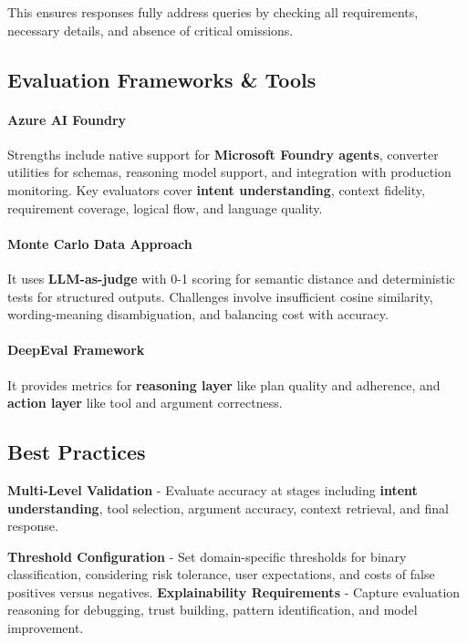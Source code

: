 \begin{TNtwocol}
This ensures responses fully address queries by checking all requirements, necessary details, and absence of critical omissions.

\subsection*{Evaluation Frameworks \& Tools}

\paragraph{\textbf{Azure AI Foundry}}

Strengths include native support for \textbf{Microsoft Foundry agents}, converter utilities for schemas, reasoning model support, and integration with production monitoring. Key evaluators cover \textbf{intent understanding}, context fidelity, requirement coverage, logical flow, and language quality.

\paragraph{\textbf{Monte Carlo Data Approach}}

It uses \textbf{LLM-as-judge} with 0-1 scoring for semantic distance and deterministic tests for structured outputs. Challenges involve insufficient cosine similarity, wording-meaning disambiguation, and balancing cost with accuracy.

\paragraph{\textbf{DeepEval Framework}}

It provides metrics for \textbf{reasoning layer} like plan quality and adherence, and \textbf{action layer} like tool and argument correctness.

\subsection*{Best Practices}

 {\textbf{Multi-Level Validation}} - Evaluate accuracy at stages including \textbf{intent understanding}, tool selection, argument accuracy, context retrieval, and final response.

{\textbf{Threshold Configuration}} - Set domain-specific thresholds for binary classification, considering risk tolerance, user expectations, and costs of false positives versus negatives.
{\textbf{Explainability Requirements}} - Capture evaluation reasoning for debugging, trust building, pattern identification, and model improvement.


\end{TNtwocol}
